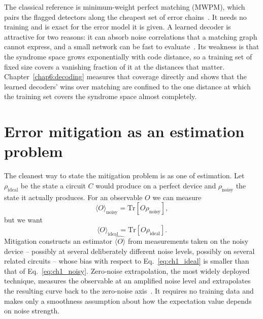 \documentclass[Thesis.tex]{subfiles}
\begin{document}
The classical reference is minimum-weight perfect matching (MWPM), which pairs the
flagged detectors along the cheapest set of error
chains~\cite{edmonds1965paths,higgott2022pymatching}. It needs no training and is
exact for the error model it is given. A learned decoder is attractive for two
reasons: it can absorb noise correlations that a matching graph cannot express, and a
small network can be fast to evaluate~\cite{torlai2017neural,bausch2024learning}.
Its weakness is that the syndrome space grows exponentially with code distance, so a
training set of fixed size covers a vanishing fraction of it at the distances that
matter. Chapter~\ref{chap6:decoding} measures that coverage directly and shows that
the learned decoders' wins over matching are confined to the one distance at which
the training set covers the syndrome space almost completely.

\section{Error mitigation as an estimation problem}

The cleanest way to state the mitigation problem is as one of estimation. Let
$\rho_{\text{ideal}}$ be the state a circuit $C$ would produce on a perfect device
and $\rho_{\text{noisy}}$ the state it actually produces. For an observable $O$ we
can measure
\begin{equation}
    \langle O \rangle_{\text{noisy}} = \mathrm{Tr}\!\left[ O \rho_{\text{noisy}} \right],
    \label{eq:ch1_noisy}
\end{equation}
but we want
\begin{equation}
    \langle O \rangle_{\text{ideal}} = \mathrm{Tr}\!\left[ O \rho_{\text{ideal}} \right].
    \label{eq:ch1_ideal}
\end{equation}
Mitigation constructs an estimator $\widehat{\langle O \rangle}$ from measurements
taken on the noisy device -- possibly at several deliberately different noise levels,
possibly on several related circuits -- whose bias with respect to
Eq.~\eqref{eq:ch1_ideal} is smaller than that of Eq.~\eqref{eq:ch1_noisy}. Zero-noise
extrapolation, the most widely deployed technique, measures the observable at an
amplified noise level and extrapolates the resulting curve back to the zero-noise
axis~\cite{temme2017error,giurgicatiron2020digital,he2020zero}. It requires no training data and makes only a smoothness assumption about how
the expectation value depends on noise strength.
\end{document}
